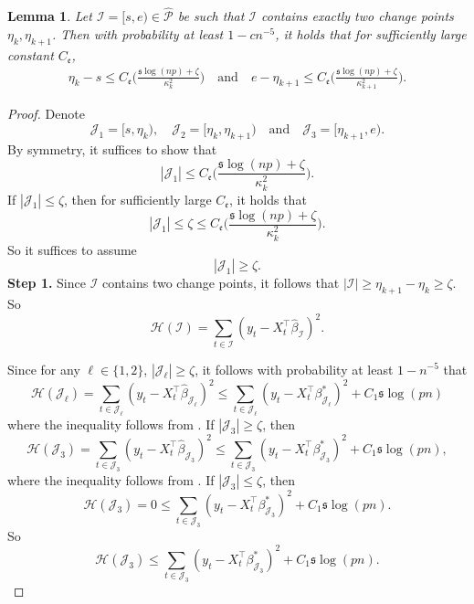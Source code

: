 \documentclass[11pt]{article}
\newcommand{\I}{{\mathcal I }}
\newcommand{\J}{{  \mathcal J } }
\newcommand{\s}{ { \mathfrak{s}  } }
\theoremstyle{plain}
\newtheorem{lemma}[theorem]{Lemma}
\theoremstyle{definition}
\begin{document}
 

 \begin{lemma}  \label{lemma:regression two change points}
Let   $ \I=[s,e) \in \mathcal {\widehat P}  $  be such that $\I$ contains  exactly two  change points $ \eta_k,\eta_{k+1}  $.
 Then  with probability  at least $1- cn^{-5}$,   it holds that for sufficiently large constant $ C_{\mathfrak e} $, 
\begin{align*} 
 \eta_k -s     \le     C_{\mathfrak{e} }  \bigg( \frac{\s \log(np) +\zeta   }{\kappa _k^2 }  \bigg)   \quad \text{and} \quad 
 e-\eta_{k+1}   \le   C_{\mathfrak{e} }\bigg( \frac{\s \log(np) +\zeta  }{\kappa_{k+1 } ^2 }   \bigg).
 \end{align*} 
 \end{lemma} 
\begin{proof} 
Denote 
 $$ \mathcal J_ 1= [ s, \eta_k ), \quad \J_2  =[\eta_k, \eta_{k+1}) \quad \text{and} \quad \J_3  = [\eta_{k+1 },e). $$
 By symmetry, it suffices to show that 
 $$|\J_1| \le  C_{\mathfrak{e} }    \bigg( \frac{\s \log(np) +  \zeta   }{\kappa _k^2 }  \bigg)   . $$
 If $ |\J_1| \le  \zeta $, then   for sufficiently large $ C_{\mathfrak{e} } $, it holds that
 $$  |\J_1| \le  \zeta \le   C_{\mathfrak{e} }    \bigg( \frac{\s \log(np) +  \zeta   }{\kappa _k^2 } \bigg)   .$$
So it suffices to assume 
$$|\J_1| \ge \zeta .  $$
{\bf Step 1.} 
 Since $ \I $ contains two change points, it follows that 
 $ |\I|  \ge \eta_{k+1}-\eta _k  \ge \zeta. $
 So 
 $$\mathcal H (\I) = \sum_{t\in \I } (y_t- X_t ^\top \widehat \beta_\I )^2.  $$

Since for any $\ell\in \{1,2\}$, $ |\J_ \ell | \ge \zeta   $, it follows with probability at least $1 - n^{-5}$ that
$$ \mathcal H(\J_\ell ) = \sum_{ t  \in \J_\ell  }(y_t  - X_t ^\top \widehat \beta _{\J_\ell }  ) ^2  \le \sum_{t  \in \J_ \ell   }(y_t  -X_t ^\top     \beta _{\J _ \ell }^*  ) ^2 +C_1 \s\log(pn)   $$
where the inequality follows from .  
 If   $ |\J_3 |  \ge   \zeta   $, then 
 $$ \mathcal H(\J_ 3) =\sum_{t  \in \J_3 }(y_t  -X_t ^\top  \widehat  \beta _{\J_3 }  ) ^2 
\le \sum_{t  \in \J_3  }(y_t  -X_t ^\top     \beta _{\J _3 }^*  ) ^2 +C_1 \s\log(pn), $$
where the inequality follows from .  
If $ |\J_3  |  \le  \zeta   $, then 
 $$ \mathcal H(\J_3 ) = 0 
\le \sum_{t  \in \J_ 3  }(y_t  -X_t ^\top     \beta _{\J _3  }^*  ) ^2 +C_1 \s\log(pn) . $$
So 
$$ \mathcal H(\J_3 )   
\le \sum_{t  \in \J_3   }(y_t  -X_t ^\top     \beta _{\J _3  }^*  ) ^2 +C_1 \s\log(pn) . $$


\end{proof}
\end{document}

